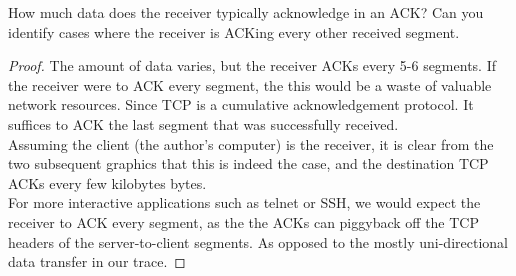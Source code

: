 \documentclass[../main.tex]{subfiles}
\begin{document}
\begin{wts}
	How much data does the receiver typically acknowledge in an ACK? Can you identify cases where the receiver is ACKing every other received segment.
\end{wts}
\begin{proof}
    The amount of data varies, but the receiver ACKs every 5-6 segments. If the receiver were to ACK every segment, the this would be a waste of valuable network resources. Since TCP is a cumulative acknowledgement protocol. It suffices to ACK the last segment that was successfully received.\\

    Assuming the client (the author’s computer) is the receiver, it is clear from the two subsequent graphics that this is indeed the case, and the destination TCP ACKs every few kilobytes bytes.\\
	
    For more interactive applications such as telnet or SSH, we would expect the receiver to ACK every segment, as the the ACKs can piggyback off the TCP headers of the server-to-client segments. As opposed to the mostly uni-directional data transfer in our trace.
\end{proof}
\newpage
\end{document}
